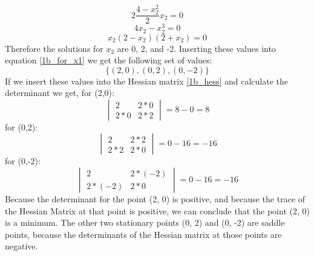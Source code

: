 \documentclass{article}
\begin{document}
\begin{equation*}
    2 \frac{4-x_2^2}{2} x_2 = 0
\end{equation*}
\begin{equation*}
    4x_2 - x_2^3 = 0
\end{equation*}
\begin{equation*}
    x_2(2-x_2)(2+x_2) = 0
\end{equation*}
Therefore the solutions for $x_2$ are 0, 2, and -2. Inserting these values into equation \eqref{1b_for_x1} we get the following set of values:
\begin{equation*}
    \{(2,0), (0,2), (0, -2)\}
\end{equation*}
If we insert these values into the Hessian matrix \eqref{1b_hess} and calculate the determinant we get, for (2,0):
\begin{equation*}
\begin{vmatrix}
    2 & 2*0\\ 2*0 & 2*2 
\end{vmatrix}
= 8 - 0 = 8
\end{equation*}
for (0,2):
\begin{equation*}
\begin{vmatrix}
    2 & 2*2\\ 2*2 & 2*0 
\end{vmatrix}
= 0 - 16 = -16
\end{equation*}
for (0,-2):
\begin{equation*}
\begin{vmatrix}
    2 & 2*(-2)\\ 2*(-2) & 2*0 
\end{vmatrix}
= 0 - 16 = -16
\end{equation*}
Because the determinant for the point (2, 0) is positive, and because the trace of the Hessian Matrix at that point is positive, we can conclude that the point (2, 0) is a minimum. The other two stationary points (0, 2) and (0, -2) are saddle points, because the determinants of the Hessian matrix at those points are negative. \\
\end{document}
